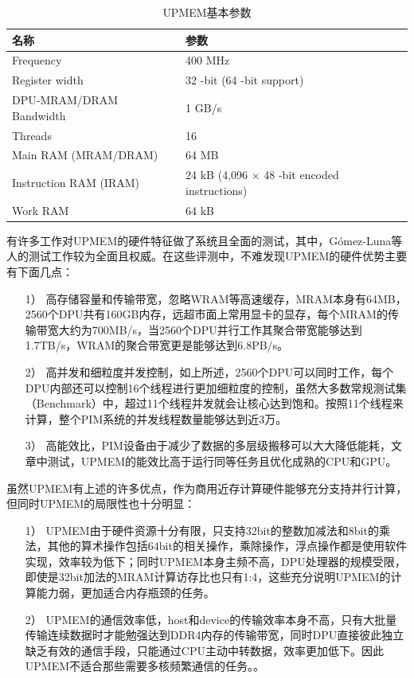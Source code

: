 \begin{table}[!htbp]
	\centering
	\caption{UPMEM基本参数}
	\label{UPMEMTable}
	\begin{tabular}{ll}
	  \toprule
	  名称 & 参数 \\
	  \midrule
	  Frequency & 400 MHz \\
	  Register width & 32 -bit (64 -bit support) \\
	  DPU-MRAM/DRAM Bandwidth & 1 GB/s \\
	  Threads & 16 \\
	  Main RAM (MRAM/DRAM) & 64 MB \\
	  Instruction RAM (IRAM) & 24 kB (4,096 $\times$ 48 -bit encoded instructions) \\
	  Work RAM & 64 kB \\
	  \bottomrule
	\end{tabular}
\end{table}

有许多工作对UPMEM的硬件特征做了系统且全面的测试\cite{BenchmarkingMutlu,BenchmarkingGermany,BenchmarkingUBC,BenchmarkingUPMEM,uPimulator}，其中，Gómez-Luna等人\cite{BenchmarkingMutlu}的测试工作较为全面且权威。在这些评测中，不难发现UPMEM的硬件优势主要有下面几点：
\begin{itemize}
	\item [1）] 
	高存储容量和传输带宽，忽略WRAM等高速缓存，MRAM本身有64MB，2560个DPU共有160GB内存，远超市面上常用显卡的显存，每个MRAM的传输带宽大约为700MB/s，当2560个DPU并行工作其聚合带宽能够达到1.7TB/s，WRAM的聚合带宽更是能够达到6.8PB/s。      
	\item [2）]
	高并发和细粒度并发控制，如上所述，2560个DPU可以同时工作，每个DPU内部还可以控制16个线程进行更加细粒度的控制，虽然大多数常规测试集（Benchmark）中，超过11个线程并发就会让核心达到饱和。按照11个线程来计算，整个PIM系统的并发线程数量能够达到近3万。
	\item [3）]
	高能效比，PIM设备由于减少了数据的多层级搬移可以大大降低能耗，文章\cite{BenchmarkingMutlu}中测试，UPMEM的能效比高于运行同等任务且优化成熟的CPU和GPU。
\end{itemize}

虽然UPMEM有上述的许多优点，作为商用近存计算硬件能够充分支持并行计算，但同时UPMEM的局限性也十分明显：
\begin{itemize}
	\item [1）] 
	UPMEM由于硬件资源十分有限，只支持32bit的整数加减法和8bit的乘法，其他的算术操作包括64bit的相关操作，乘除操作，浮点操作都是使用软件实现，效率较为低下；同时UPMEM本身主频不高，DPU处理器的规模受限，即使是32bit加法的MRAM计算访存比也只有1:4\cite{BenchmarkingMutlu}，这些充分说明UPMEM的计算能力弱，更加适合内存瓶颈的任务。
	\item [2）]
	UPMEM的通信效率低，host和device的传输效率本身不高，只有大批量传输连续数据时才能勉强达到DDR4内存的传输带宽，同时DPU直接彼此独立缺乏有效的通信手段，只能通过CPU主动中转数据，效率更加低下。因此UPMEM不适合那些需要多核频繁通信的任务。\cite{BenchmarkingMutlu}。
\end{itemize}

